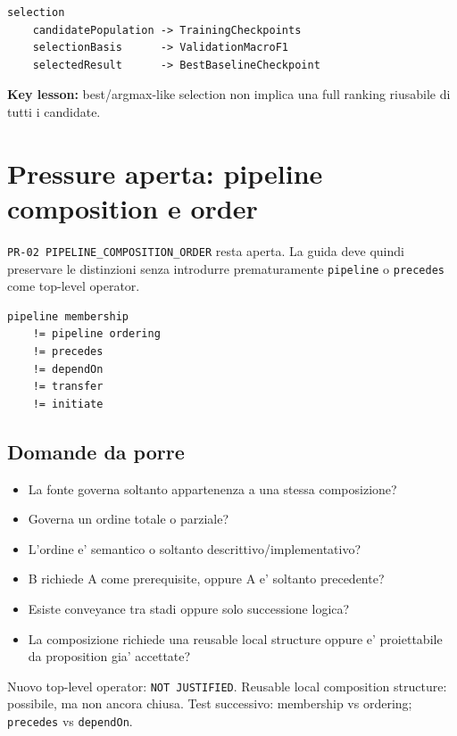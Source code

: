 \documentclass[11pt,a4paper]{article}
\providecommand{\Rtwentyfivetag}{\ddtatag{DDTATeal}{R25 EVIDENCE}}
\begin{document}
\begin{ddtaexample}[title={FR-20 - best checkpoint by validation Macro F1}]
\begin{lstlisting}
selection
    candidatePopulation -> TrainingCheckpoints
    selectionBasis      -> ValidationMacroF1
    selectedResult      -> BestBaselineCheckpoint
\end{lstlisting}
\textbf{Key lesson:} best/argmax-like selection non implica una full ranking riusabile di tutti i candidate.
\end{ddtaexample}


\section{Pressure aperta: pipeline composition e order}
\opentag\quad\Rtwentyfivetag

\texttt{PR-02 PIPELINE\_COMPOSITION\_ORDER} resta aperta. La guida deve quindi preservare le distinzioni senza introdurre prematuramente \texttt{pipeline} o \texttt{precedes} come top-level operator.

\begin{lstlisting}
pipeline membership
    != pipeline ordering
    != precedes
    != dependOn
    != transfer
    != initiate
\end{lstlisting}

\subsection{Domande da porre}
\begin{itemize}
  \item La fonte governa soltanto appartenenza a una stessa composizione?
  \item Governa un ordine totale o parziale?
  \item L'ordine e' semantico o soltanto descrittivo/implementativo?
  \item B richiede A come prerequisite, oppure A e' soltanto precedente?
  \item Esiste conveyance tra stadi oppure solo successione logica?
  \item La composizione richiede una reusable local structure oppure e' proiettabile da proposition gia' accettate?
\end{itemize}

\begin{ddtaopen}[title={Current disposition}]
Nuovo top-level operator: \texttt{NOT JUSTIFIED}. Reusable local composition structure: possibile, ma non ancora chiusa. Test successivo: membership vs ordering; \texttt{precedes} vs \texttt{dependOn}.
\end{ddtaopen}
\end{document}
